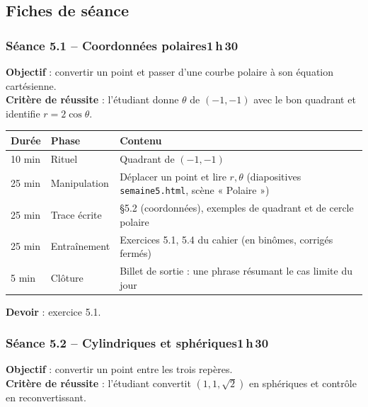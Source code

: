 \documentclass[10.5pt,a4paper]{article}
\newif\ifprof
\newcommand{\profonly}[1]{\ifprof #1\fi}
\begin{document}
\subsection{Fiches de séance}
\subsubsection*{\textcolor{marine}{Séance 5.1 -- Coordonnées polaires}\hfill\normalfont\small\textcolor{ardoise}{1\,h\,30}}
\begin{objectif}\textbf{Objectif} : convertir un point et passer d'une courbe polaire à son équation cartésienne.\\\textbf{Critère de réussite} : l'étudiant donne $\theta$ de $(-1,-1)$ avec le bon quadrant et identifie $r=2\cos\theta$.\end{objectif}\nopagebreak
\begin{longtable}{@{}p{1.1cm}p{2.4cm}p{12.4cm}@{}}
\toprule \textbf{Durée} & \textbf{Phase} & \textbf{Contenu}\\ \midrule\endhead
10 min & Rituel & Quadrant de $(-1,-1)$\\
25 min & Manipulation & Déplacer un point et lire $r,\theta$ (diapositives \texttt{semaine5.html}, scène « Polaire »)\\
25 min & Trace écrite & \S5.2 (coordonnées), exemples de quadrant et de cercle polaire\\
25 min & Entraînement & Exercices 5.1, 5.4 du cahier (en binômes, corrigés fermés)\\
5 min & Clôture & Billet de sortie : une phrase résumant le cas limite du jour\\ \bottomrule\end{longtable}\nopagebreak
\textbf{Devoir} : exercice 5.1.\profonly{ \textbf{Point de vigilance} : Origine et axes : $\theta$ indéterminé ou obtenu sans $\arctan$.}\par
{}\subsubsection*{\textcolor{marine}{Séance 5.2 -- Cylindriques et sphériques}\hfill\normalfont\small\textcolor{ardoise}{1\,h\,30}}
\begin{objectif}\textbf{Objectif} : convertir un point entre les trois repères.\\\textbf{Critère de réussite} : l'étudiant convertit $(1,1,\sqrt2)$ en sphériques et contrôle en reconvertissant.\end{objectif}\nopagebreak
\end{document}
